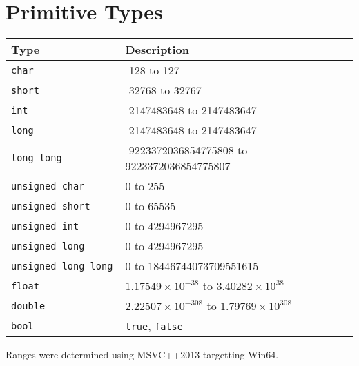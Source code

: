 \chapter{Primitive Types}
\begin{center}
  \begin{tabular}{ll}
    \textbf{Type} & \textbf{Description} \\
    \toprule
    \tt char & -128 to 127 \\
    \tt short & -32768 to 32767 \\
    \tt int & -2147483648 to 2147483647 \\
    \tt long & -2147483648 to 2147483647 \\
    \tt long long & -9223372036854775808 to 9223372036854775807 \\
    \midrule
    \tt unsigned char & 0 to 255 \\
    \tt unsigned short & 0 to 65535 \\
    \tt unsigned int & 0 to 4294967295 \\
    \tt unsigned long & 0 to 4294967295 \\
    \tt unsigned long long & 0 to 18446744073709551615 \\
    \midrule
    \tt float & $1.17549 \times 10^{-38}$ to $3.40282 \times 10^{38}$ \\
    \tt double & $2.22507 \times 10^{-308}$ to $1.79769 \times 10^{308}$ \\
    \midrule
    \tt bool & {\tt true}, {\tt false} \\
    \bottomrule
  \end{tabular}
\end{center}
Ranges were determined using MSVC++2013 targetting Win64.
\begin{extra}
\end{extra}


